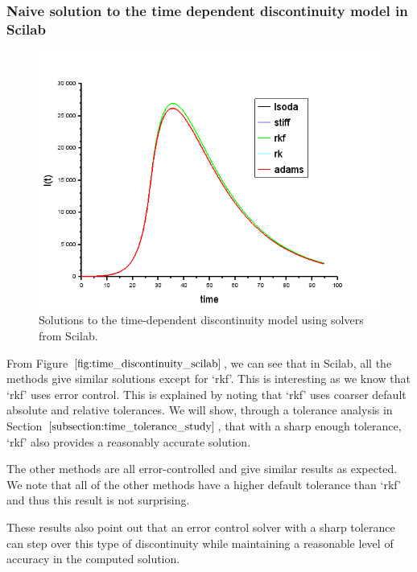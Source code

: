 \subsubsection{Naive solution to the time dependent discontinuity model in Scilab}
\begin{figure}[H]
\centering
\includegraphics[width=0.7\linewidth]{./figures/time_discontinuity_scilab}
\caption{Solutions to the time-dependent discontinuity model using solvers from Scilab.}
\label{fig:time_discontinuity_scilab}
\end{figure}
From Figure $\ref{fig:time_discontinuity_scilab}$, we can see that in Scilab, all the methods give similar solutions except for `rkf'. This is interesting as we know that `rkf' uses error control. This is explained by noting that `rkf' uses coarser default absolute and relative tolerances. We will show, through a tolerance analysis in Section $\ref{subsection:time_tolerance_study}$, that with a sharp enough tolerance, `rkf' also provides a reasonably accurate solution.

The other methods are all error-controlled and give similar results as expected. We note that all of the other methods have a higher default tolerance than `rkf' and thus this result is not surprising.

These results also point out that an error control solver with a sharp tolerance can step over this type of discontinuity while maintaining a reasonable level of accuracy in the computed solution.

